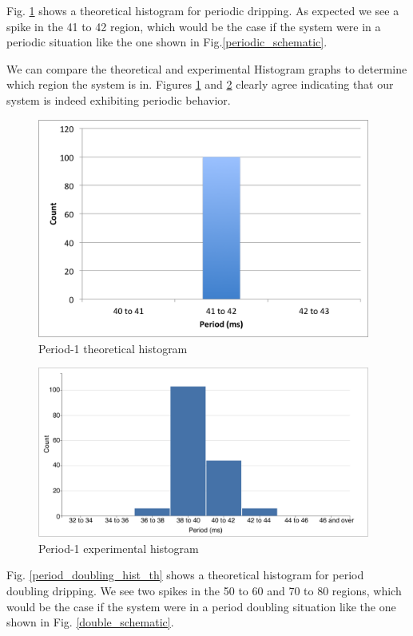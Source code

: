 \documentclass[11pt]{article}
\begin{document}
Fig. \ref{periodic_hist_th} shows a theoretical histogram for periodic dripping. As expected we see a spike in the 41 to 42 region, which would be the case if the system were in a periodic situation like the one shown in Fig.\ref{periodic_schematic}.

We can compare the theoretical and experimental Histogram graphs to determine which region the system is in. Figures \ref{periodic_hist_th} and \ref{periodic_hist} clearly agree indicating that our system is indeed exhibiting periodic behavior.

\newpage
\begin{figure}[htp]
\begin{center}
\includegraphics[width=4.3in]{figs/periodic_hist_th}
\caption{ Period-1 theoretical histogram }
\label{periodic_hist_th}
\end{center}
\end{figure}
\begin{figure}[htp]
\begin{center}
\includegraphics[width=4.3in]{figs/periodic_hist_2}
\caption{ Period-1 experimental histogram }
\label{periodic_hist}
\end{center}
\end{figure}

\newpage
Fig. \ref{period_doubling_hist_th} shows a theoretical histogram for period doubling dripping. We see two spikes in the 50 to 60 and 70 to 80 regions, which would be the case if the system were in a period doubling situation like the one shown in Fig. \ref{double_schematic}.
\end{document}
